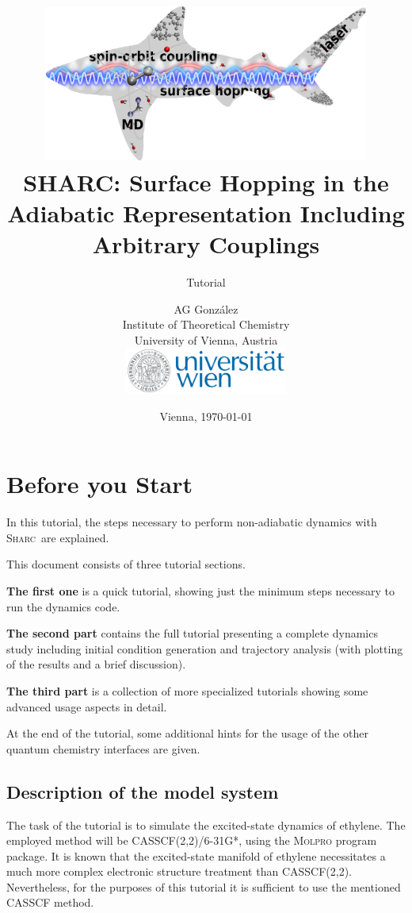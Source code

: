 \documentclass[a4paper,11pt,DIV=15,openany]{scrbook}
\title{\hspace{1cm}\includegraphics[width=0.8\textwidth,keepaspectratio=true]{img/sharc.png}\vspace{1.5cm}\\
    SHARC: Surface Hopping in the Adiabatic Representation Including Arbitrary Couplings}
\subtitle{Tutorial}
\date{Vienna, \today}
\author{AG Gonz\'alez\\
Institute of Theoretical Chemistry\\
University of Vienna, Austria
\vspace{1cm}
\\
\includegraphics[width=0.4\textwidth,keepaspectratio=true]{img/univie.pdf}}
\newcommand{\sharc}{\textsc{Sharc}}
\begin{document}


\tableofcontents


\chapter{Before you Start}

In this tutorial, the steps necessary to perform non-adiabatic dynamics with \sharc\ are explained. 

This document consists of three tutorial sections. 

\textbf{The first one} is a quick tutorial, showing just the minimum steps necessary to run the dynamics code. 

\textbf{The second part} contains the full tutorial presenting a complete dynamics study including initial condition generation and trajectory analysis (with plotting of the results and a brief discussion). 

\textbf{The third part} is a collection of more specialized tutorials showing some advanced usage aspects in detail.

At the end of the tutorial, some additional hints for the usage of the other quantum chemistry interfaces are given.




\section{Description of the model system}

The task of the tutorial is to simulate the excited-state dynamics of ethylene. The employed method will be CASSCF(2,2)/6-31G*, using the \textsc{Molpro} program package. It is known that the excited-state manifold of ethylene necessitates a much more complex electronic structure treatment than CASSCF(2,2). Nevertheless, for the purposes of this tutorial it is sufficient to use the mentioned CASSCF method.
\end{document}
